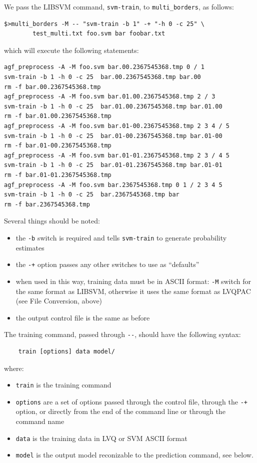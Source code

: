 \documentclass[12pt]{article}
\begin{document}
We pass the LIBSVM command, \verb"svm-train", to \verb"multi_borders", as follows:
\begin{verbatim}
$>multi_borders -M -- "svm-train -b 1" -+ "-h 0 -c 25" \
		test_multi.txt foo.svm bar foobar.txt
\end{verbatim}
which will execute the following statements:
\begin{verbatim}
agf_preprocess -A -M foo.svm bar.00.2367545368.tmp 0 / 1
svm-train -b 1 -h 0 -c 25  bar.00.2367545368.tmp bar.00
rm -f bar.00.2367545368.tmp
agf_preprocess -A -M foo.svm bar.01.00.2367545368.tmp 2 / 3
svm-train -b 1 -h 0 -c 25  bar.01.00.2367545368.tmp bar.01.00
rm -f bar.01.00.2367545368.tmp
agf_preprocess -A -M foo.svm bar.01-00.2367545368.tmp 2 3 4 / 5
svm-train -b 1 -h 0 -c 25  bar.01-00.2367545368.tmp bar.01-00
rm -f bar.01-00.2367545368.tmp
agf_preprocess -A -M foo.svm bar.01-01.2367545368.tmp 2 3 / 4 5
svm-train -b 1 -h 0 -c 25  bar.01-01.2367545368.tmp bar.01-01
rm -f bar.01-01.2367545368.tmp
agf_preprocess -A -M foo.svm bar.2367545368.tmp 0 1 / 2 3 4 5
svm-train -b 1 -h 0 -c 25  bar.2367545368.tmp bar
rm -f bar.2367545368.tmp
\end{verbatim}

Several things should be noted:
\begin{itemize}
\item the \verb/-b/ switch is required and tells \verb/svm-train/ to generate probability estimates
\item the \verb/-+/ option passes any other switches to use as ``defaults''
\item when used in this way, training data must be in ASCII format: \verb/-M/ switch for the same format as LIBSVM, otherwise it uses the same format as LVQPAC (see File Conversion, above)
\item the output control file is the same as before
\end{itemize}

The training command, passed through \verb/--/, should have the following syntax:
\begin{verbatim}
    train [options] data model/
\end{verbatim}
where:
\begin{itemize}
\item \verb/train/ is the training command
\item \verb/options/ are a set of options passed through the control file, through the \verb/-+/ option, or directly from the end of the command line or through the command name
\item \verb/data/ is the training data in LVQ or SVM ASCII format
\item \verb/model/ is the output model reconizable to the prediction command, see below.
\end{itemize}
\end{document}
